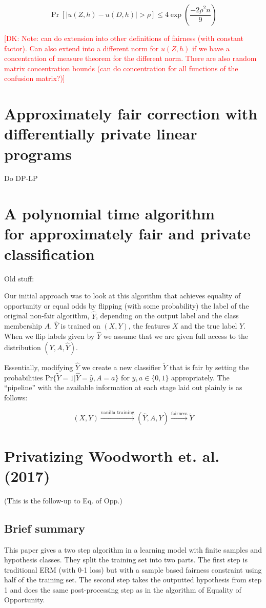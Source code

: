 \documentclass[format = sigconf]{acmart}
\newcommand{\dk}[1]{\textcolor{red}{[DK: #1]}}
\newcommand{\1}{\mathbbm{1}}
\theoremstyle{definition}
\begin{document}
$$\Pr[|u(Z,h) - u(D,h)| > \rho] \leq 4\exp(\frac{-2\rho^2n}{9})$$

\dk {Note: can do extension into other definitions of fairness (with constant factor).
Can also extend into a different norm for $u(Z,h)$ if we have a concentration of measure theorem for the different norm. There are also random matrix concentration bounds (can do concentration for all functions of the confusion matrix?)}

\section{Approximately fair correction with differentially private linear programs}
Do DP-LP

\section{A polynomial time algorithm \\for approximately fair and private classification}
\clearpage

Old stuff:

Our initial approach was to look at this algorithm that achieves equality of opportunity or equal odds by flipping (with some probability) the label of the original non-fair algorithm, $\hat{Y}$, depending on the output label and the class membership $A$. $\hat{Y}$ is trained on $(X,Y)$, the features $X$ and the true label $Y$. When we flip labels given by $\hat{Y}$ we assume that we are given full access to the distribution $(Y,A,\hat{Y})$.

Essentially, modifying $\hat{Y}$ we create a new classifier $\tilde{Y}$ that is fair by setting the probabilities $\text{Pr}\{\tilde{Y} = 1 | \hat{Y} = \hat{y}, A = a \}$ for $\hat{y}, a \in \{0,1\}$ appropriately. The ``pipeline'' with the available information at each stage laid out plainly is as follows:

$$(X,Y) \xrightarrow[]{\text{vanilla training}} (\hat{Y},A,Y) \xrightarrow[]{\text{fairness}} \tilde{Y} $$


\section{Privatizing Woodworth et. al. (2017)}
(This is the follow-up to Eq. of Opp.)

\subsection{Brief summary}
This paper gives a two step algorithm in a learning model with finite samples and hypothesis classes. They split the training set into two parts. The first step is traditional ERM (with 0-1 loss) but with a sample based fairness constraint using half of the training set. The second step takes the outputted hypothesis from step 1 and does the same post-processing step as in the algorithm of Equality of Opportunity.
\end{document}
